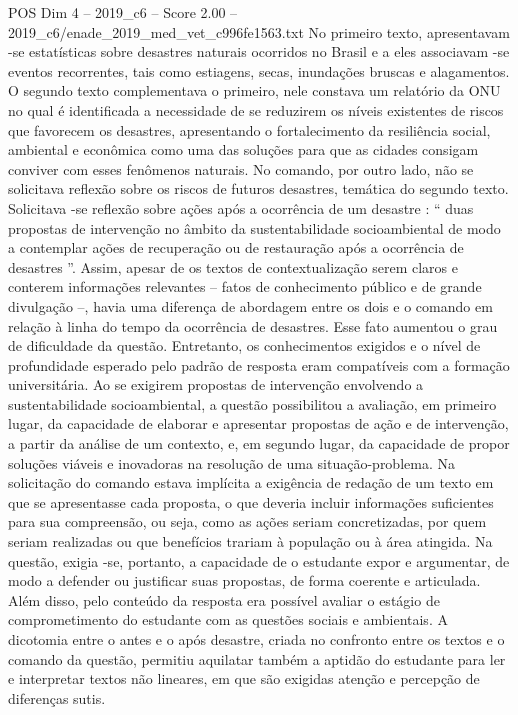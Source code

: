 \begin{textsample}{POS Dim 4 – 2019\_c6 – Score 2.00 – 2019\_c6/enade\_2019\_med\_vet\_c996fe1563.txt}
No primeiro texto, apresentavam -se estatísticas sobre desastres naturais ocorridos no Brasil e a eles associavam -se eventos recorrentes, tais como estiagens, secas, inundações bruscas e alagamentos.
O segundo texto complementava o primeiro, nele constava um relatório da ONU no qual é identificada a necessidade de se reduzirem os níveis existentes de riscos que favorecem os desastres, apresentando o fortalecimento da resiliência social, ambiental e econômica como uma das soluções para que as cidades consigam conviver com esses fenômenos naturais.
No comando, por outro lado, não se solicitava reflexão sobre os riscos de futuros desastres, temática do segundo texto.
Solicitava -se reflexão sobre ações após a ocorrência de um desastre : “ duas propostas de intervenção no âmbito da sustentabilidade socioambiental de modo a contemplar ações de recuperação ou de restauração após a ocorrência de desastres ”.
Assim, apesar de os textos de contextualização serem claros e conterem informações relevantes – fatos de conhecimento público e de grande divulgação –, havia uma diferença de abordagem entre os dois e o comando em relação à linha do tempo da ocorrência de desastres.
Esse fato aumentou o grau de dificuldade da questão.
Entretanto, os conhecimentos exigidos e o nível de profundidade esperado pelo padrão de resposta eram compatíveis com a formação universitária.
Ao se exigirem propostas de intervenção envolvendo a sustentabilidade socioambiental, a questão possibilitou a avaliação, em primeiro lugar, da capacidade de elaborar e apresentar propostas de ação e de intervenção, a partir da análise de um contexto, e, em segundo lugar, da capacidade de propor soluções viáveis e inovadoras na resolução de uma situação-problema.
Na solicitação do comando estava implícita a exigência de redação de um texto em que se apresentasse cada proposta, o que deveria incluir informações suficientes para sua compreensão, ou seja, como as ações seriam concretizadas, por quem seriam realizadas ou que benefícios trariam à população ou à área atingida.
Na questão, exigia -se, portanto, a capacidade de o estudante expor e argumentar, de modo a defender ou justificar suas propostas, de forma coerente e articulada.
Além disso, pelo conteúdo da resposta era possível avaliar o estágio de comprometimento do estudante com as questões sociais e ambientais.
A dicotomia entre o antes e o após desastre, criada no confronto entre os textos e o comando da questão, permitiu aquilatar também a aptidão do estudante para ler e interpretar textos não lineares, em que são exigidas atenção e percepção de diferenças sutis.

\end{textsample}
